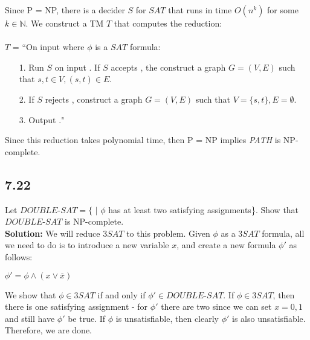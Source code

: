 \par Since P = NP, there is a decider $S$ for $SAT$ that runs in time $O(n^k)$ for some $k \in \mathbb{N}$. We construct a TM $T$ that computes the reduction:
\\ \\
$T$ = ``On input \angles{\phi} where $\phi$ is a $SAT$ formula:
\begin{enumerate}
\item[1.]Run $S$ on input \angles{\phi}. If $S$ accepts \angles{\phi}, the construct a graph $G = (V, E)$ such that $s, t \in V, (s, t) \in E$.
\item[2.]If $S$ rejects \angles{\phi}, construct a graph $G = (V, E)$ such that $V = \{s, t\}, E = \emptyset$.
\item[3.]Output ."
\end{enumerate}
Since this reduction takes polynomial time, then P = NP implies \emph{PATH} is NP-complete.

\subsection*{7.22} Let $DOUBLE$-$SAT = \{$\angles{\phi} $|$ $\phi$ has at least two satisfying assignments\}. Show that $DOUBLE$-$SAT$ is NP-complete.
\\
\textbf{Solution:} We will reduce $3SAT$ to this problem. Given $\phi$ as a $3SAT$ formula, all we need to do is to introduce a new variable $x$, and create a new formula $\phi'$ as follows:
\begin{center}
$\phi' = \phi \wedge (x \vee \overline{x})$
\end{center}
We show that $\phi \in 3SAT$ if and only if $\phi' \in DOUBLE$-$SAT$. If $\phi \in 3SAT$, then there is one satisfying assignment - for $\phi'$ there are two since we can set $x = 0, 1$ and still have $\phi'$ be true. If $\phi$ is unsatisfiable, then clearly $\phi'$ is also unsatisfiable. Therefore, we are done.